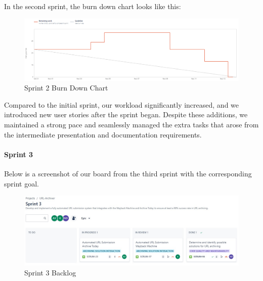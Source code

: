 In the second sprint, the burn down chart looks like this:
\begin{figure}[h!]
    \centering
    \includegraphics[width=1\textwidth]{pictures/Scrum/Sprint 2/Sprint2_burndownchart}
    \caption{Sprint 2 Burn Down Chart}
    \label{fig:sprint_2_bunrdown_chart}
\end{figure}

Compared to the initial sprint, our workload significantly increased, and we introduced new user stories after the sprint began.
Despite these additions, we maintained a strong pace and seamlessly managed the extra tasks that arose from the intermediate presentation and documentation requirements.
\clearpage


\paragraph{Sprint 3}
Below is a screenshot of our board from the third sprint with the corresponding sprint goal.
\begin{figure}[h!]
    \centering
    \includegraphics[width=1\textwidth]{pictures/Scrum/Sprint 3/Sprint3_Backlog}
    \caption{Sprint 3 Backlog}
    \label{fig:sprint_3_backlog}
\end{figure}

